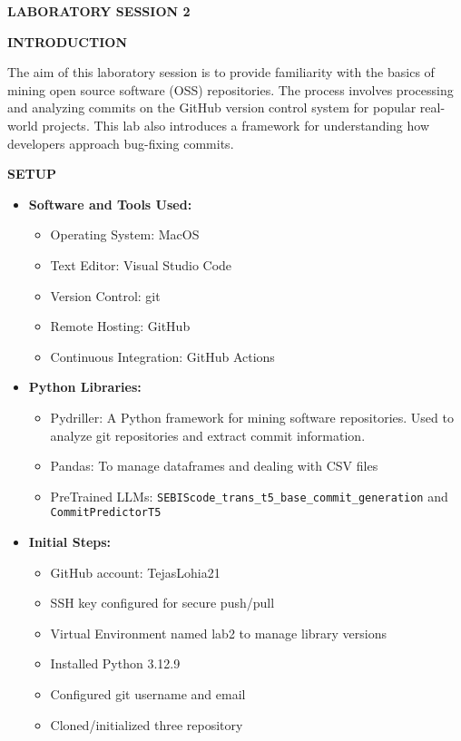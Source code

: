 \documentclass[12pt,a4paper]{article}
\newcommand{\sectionbar}[1]{%
  \vspace{0.6\baselineskip}%
  \noindent
  \colorbox{sectionbar}{%
    \parbox{\dimexpr\linewidth-2\fboxsep\relax}{%
      \textbf{\Large\textsf{#1}}%
    }%
  }%
  \vspace{0.6\baselineskip}
}
\begin{document}
\sectionbar{LABORATORY SESSION 2}


\sectionbar{INTRODUCTION}
The aim of this laboratory session is to provide familiarity with the basics of mining open source software (OSS) repositories. 
The process involves processing and analyzing commits on the GitHub version control system for popular real-world projects. 
This lab also introduces a framework for understanding how developers approach bug-fixing commits.

\sectionbar{SETUP}

\begin{itemize}
    \item \textbf{Software and Tools Used:}
    \begin{itemize}
        \item Operating System: MacOS
        \item Text Editor: Visual Studio Code
        \item Version Control: git
        \item Remote Hosting: GitHub
        \item Continuous Integration: GitHub Actions
    \end{itemize}
    \item \textbf{Python Libraries:}
    \begin{itemize}
        \item Pydriller: A Python framework for mining software repositories. Used to analyze git repositories and extract commit information.
        \item Pandas: To manage dataframes and dealing with CSV files
        \item PreTrained LLMs: \texttt{SEBIS\/code\_trans\_t5\_base\_commit\_generation} and \texttt{CommitPredictorT5}
    \end{itemize}
    \item \textbf{Initial Steps:}
    \begin{itemize}
        \item GitHub account: TejasLohia21
        \item SSH key configured for secure push/pull
        \item Virtual Environment named lab2 to manage library versions
        \item Installed Python 3.12.9
        \item Configured git username and email
        \item Cloned/initialized three repository
    \end{itemize}
\end{itemize}
\end{document}
